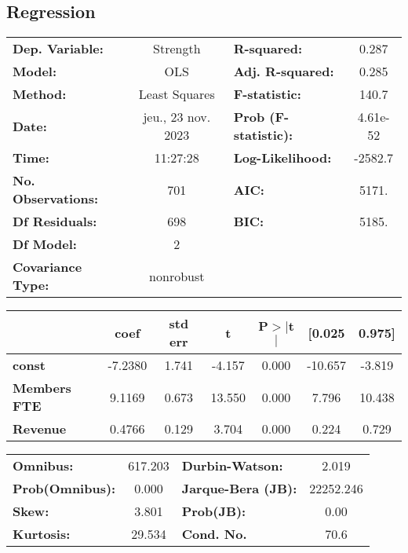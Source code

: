 \documentclass[ 11pt]{article}
\begin{document}
	\newpage
	\subsection{Regression}
	\begin{center}
\begin{tabular}{lclc}
\toprule
\textbf{Dep. Variable:}    &      Strength      & \textbf{  R-squared:         } &     0.287   \\
\textbf{Model:}            &        OLS         & \textbf{  Adj. R-squared:    } &     0.285   \\
\textbf{Method:}           &   Least Squares    & \textbf{  F-statistic:       } &     140.7   \\
\textbf{Date:}             & jeu., 23 nov. 2023 & \textbf{  Prob (F-statistic):} &  4.61e-52   \\
\textbf{Time:}             &      11:27:28      & \textbf{  Log-Likelihood:    } &   -2582.7   \\
\textbf{No. Observations:} &          701       & \textbf{  AIC:               } &     5171.   \\
\textbf{Df Residuals:}     &          698       & \textbf{  BIC:               } &     5185.   \\
\textbf{Df Model:}         &            2       & \textbf{                     } &             \\
\textbf{Covariance Type:}  &     nonrobust      & \textbf{                     } &             \\
\bottomrule
\end{tabular}
\begin{tabular}{lcccccc}
                     & \textbf{coef} & \textbf{std err} & \textbf{t} & \textbf{P$> |$t$|$} & \textbf{[0.025} & \textbf{0.975]}  \\
\midrule
\textbf{const}       &      -7.2380  &        1.741     &    -4.157  &         0.000        &      -10.657    &       -3.819     \\
\textbf{Members FTE} &       9.1169  &        0.673     &    13.550  &         0.000        &        7.796    &       10.438     \\
\textbf{Revenue}     &       0.4766  &        0.129     &     3.704  &         0.000        &        0.224    &        0.729     \\
\bottomrule
\end{tabular}
\begin{tabular}{lclc}
\textbf{Omnibus:}       & 617.203 & \textbf{  Durbin-Watson:     } &     2.019  \\
\textbf{Prob(Omnibus):} &   0.000 & \textbf{  Jarque-Bera (JB):  } & 22252.246  \\
\textbf{Skew:}          &   3.801 & \textbf{  Prob(JB):          } &      0.00  \\
\textbf{Kurtosis:}      &  29.534 & \textbf{  Cond. No.          } &      70.6  \\
\bottomrule
\end{tabular}
\end{center}
\end{document}
